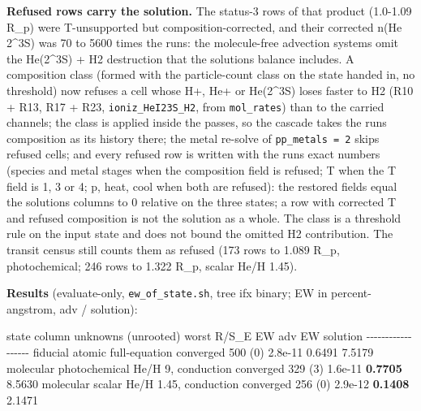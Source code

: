 \documentclass[english,a4paper]{my_memo}
\begin{document}
\textbf{Refused rows carry the solution.} The status-3 rows of that product
(1.0-1.09 R\_p) were T-unsupported but composition-corrected, and their
corrected n(He 2\^{}3S) was 70 to 5600 times the run\textquotesingle s: the molecule-free
advection systems omit the He(2\^{}3S) + H2 destruction that the solution\textquotesingle s
balance includes. A composition class (formed with the particle-count class
on the state handed in, no threshold) now refuses a cell whose H+, He+ or
He(2\^{}3S) loses faster to H2 (R10 + R13, R17 + R23, \texttt{ioniz\_HeI23S\_H2}, from
\texttt{mol\_rates}) than to the carried channels; the class is applied inside the
passes, so the cascade takes the run\textquotesingle s composition as its history there;
the metal re-solve of \texttt{pp\_metals\ =\ 2} skips refused cells; and every refused
row is written with the run\textquotesingle s exact numbers (species and metal stages when
the composition field is refused; T when the T field is 1, 3 or 4; p, heat,
cool when both are refused): the restored fields equal the solution\textquotesingle s
columns to 0 relative on the three states; a row with corrected T and
refused composition is not the solution as a whole. The class is a
threshold rule on the input state and does not bound the omitted H2
contribution. The transit census still counts
them as refused (173 rows to 1.089 R\_p, photochemical; 246 rows to 1.322
R\_p, scalar He/H 1.45).

\textbf{Results} (evaluate-only, \texttt{ew\_of\_state.sh}, tree ifx binary; EW in
percent-angstrom, adv / solution):

\textbar{} state \textbar{} column \textbar{} unknowns (unrooted) \textbar{} worst \textbar R\textbar/S\_E \textbar{} EW adv \textbar{} EW solution \textbar{}
\textbar-\/-\/-\textbar-\/-\/-\textbar-\/-\/-\textbar-\/-\/-\textbar-\/-\/-\textbar-\/-\/-\textbar{}
\textbar{} fiducial atomic full-equation \textbar{} converged \textbar{} 500 (0) \textbar{} 2.8e-11 \textbar{} 0.6491 \textbar{} 7.5179 \textbar{}
\textbar{} molecular photochemical He/H 9, conduction \textbar{} converged \textbar{} 329 (3) \textbar{} 1.6e-11 \textbar{} \textbf{0.7705} \textbar{} 8.5630 \textbar{}
\textbar{} molecular scalar He/H 1.45, conduction \textbar{} converged \textbar{} 256 (0) \textbar{} 2.9e-12 \textbar{} \textbf{0.1408} \textbar{} 2.1471 \textbar{}
\end{document}
